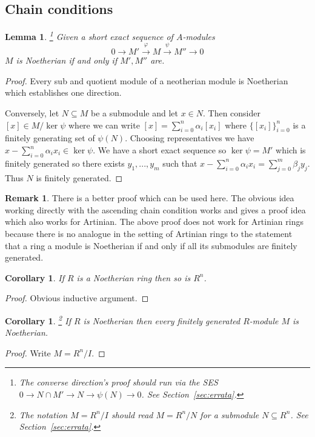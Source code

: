 \documentclass[12pt]{article}
\theoremstyle{plain}
\newtheorem{lemma}[thm]{Lemma}
\newtheorem{cor}[thm]{Corollary}
\theoremstyle{definition}
\newtheorem{remark}[thm]{Remark}
\newcommand{\lto}{\longrightarrow}
\begin{document}
\subsection{Chain conditions}
\begin{lemma}
\label{lem:neotherian_ses}\footnote{The converse direction's proof should run via the SES $0 \to N\cap M' \to N \to \psi(N) \to 0$. See Section~\ref{sec:errata}.} Given a short exact sequence of $A$-modules
\[0 \lto M' \stackrel{\varphi}{\lto} M \stackrel{\psi}{\lto} M'' \lto 0\]
$M$ is Noetherian if and only if $M',M''$ are.
\end{lemma}
\begin{proof}
Every sub and quotient module of a neotherian module is Noetherian which establishes one direction.

Conversely, let $N \subseteq M$ be a submodule and let $x \in N$. Then consider $[x] \in M/\ker \psi$ where we can write $[x] = \sum_{i = 0}^n \alpha_i [x_i]$ where $\lbrace [x_i]\rbrace_{i = 0}^n$ is a finitely generating set of $\psi(N)$. Choosing representatives we have $x - \sum_{i = 0}^n\alpha_i x_i \in \ker \psi$. We have a short exact sequence so $\ker \psi = M'$ which is finitely generated so there exists $y_1,...,y_m$ such that $x - \sum_{i = 0}^n \alpha_i x_i = \sum_{j = 0}^m\beta_j y_j$. Thus $N$ is finitely generated.
\end{proof}
\begin{remark}
There is a better proof which can be used here. The obvious idea working directly with the ascending chain condition works and gives a proof idea which also works for Artinian. The above proof does not work for Artinian rings because there is no analogue in the setting of Artinian rings to the statement that a ring a module is Noetherian if and only if all its submodules are finitely generated.
\end{remark}
\begin{cor}
If $R$ is a Noetherian ring then so is $R^n$.
\end{cor}
\begin{proof}
Obvious inductive argument.
\end{proof}
\begin{cor}\footnote{The notation $M=R^n/I$ should read $M=R^n/N$ for a submodule $N\subseteq R^n$. See Section~\ref{sec:errata}.}
If $R$ is Noetherian then every finitely generated $R$-module $M$ is Noetherian.
\end{cor}
\begin{proof}
Write $M = R^n/I$.
\end{proof}
\end{document}
